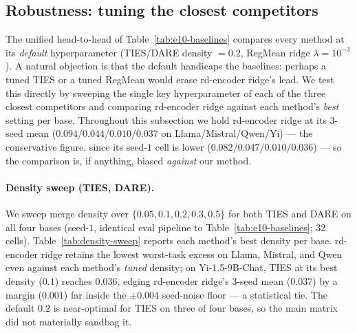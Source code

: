 
\subsection{Robustness: tuning the closest competitors}
\label{subsec:exp-robustness}

The unified head-to-head of Table~\ref{tab:e10-baselines} compares every
method at its \emph{default} hyperparameter (TIES/DARE density $=0.2$,
RegMean ridge $\lambda = 10^{-3}$). A natural objection is that the default
handicaps the baselines: perhaps a tuned TIES or a tuned RegMean would erase
rd-encoder ridge's lead. We test this directly by sweeping the single key
hyperparameter of each of the three closest competitors and comparing rd-encoder
ridge against each method's \emph{best} setting per base. Throughout this
subsection we hold rd-encoder ridge at its $3$-seed mean
($0.094/0.044/0.010/0.037$ on Llama/Mistral/Qwen/Yi) --- the conservative
figure, since its seed-$1$ cell is lower ($0.082/0.047/0.010/0.036$) --- so the
comparison is, if anything, biased \emph{against} our method.

\paragraph{Density sweep (TIES, DARE).}
We sweep merge density over $\{0.05, 0.1, 0.2, 0.3, 0.5\}$ for both TIES and
DARE on all four bases (seed-$1$, identical eval pipeline to
Table~\ref{tab:e10-baselines}; $32$ cells). Table~\ref{tab:density-sweep}
reports each method's best density per base. rd-encoder ridge retains the
lowest worst-task excess on Llama, Mistral, and Qwen even against each method's
\emph{tuned} density; on Yi-1.5-9B-Chat, TIES at its best density ($0.1$)
reaches $0.036$, edging rd-encoder ridge's $3$-seed mean ($0.037$) by a margin
($0.001$) far inside the $\pm 0.004$ seed-noise floor --- a statistical tie.
The default $0.2$ is near-optimal for TIES on three of four bases, so the main
matrix did not materially sandbag it.


